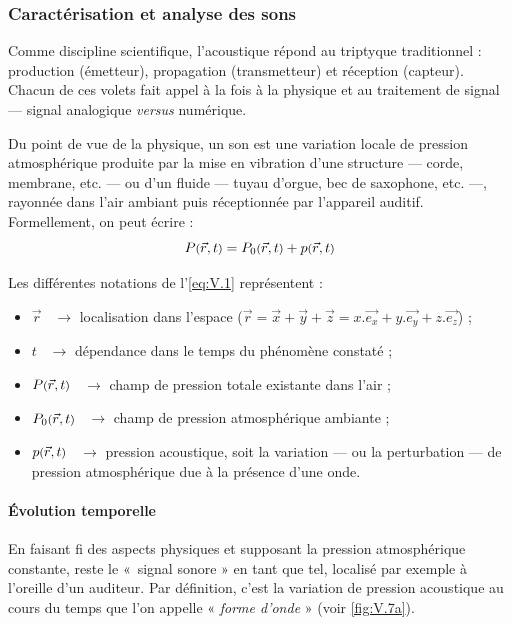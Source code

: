 \subsubsection[Caractérisation et analyse des sons]{Caractérisation et analyse des sons}
\label{subsub:V.2.2.1}

Comme discipline scientifique, l'acoustique répond au triptyque traditionnel : production (émetteur), propagation (transmetteur) et réception (capteur). Chacun de ces volets fait appel à la fois à la physique et au traitement de signal --- signal analogique \textit{versus} numérique. 


Du point de vue de la physique, un son est une variation locale de pression atmosphérique produite par la mise en vibration d'une structure --- corde, membrane, etc. --- ou d'un fluide --- tuyau d'orgue, bec de saxophone, etc. ---, rayonnée dans l'air ambiant puis réceptionnée par l'appareil auditif.
Formellement, on peut écrire :
\begin{equation}
P\mbox{\footnotesize (} \vec{r},t \mbox{\footnotesize )} = P_{0}\mbox{\footnotesize (} \vec{r},t \mbox{\footnotesize )} + p\mbox{\footnotesize (} \vec{r},t \mbox{\footnotesize )}
\label{eq:V.1}
\end{equation}

Les différentes notations de l'\cref{eq:V.1} représentent :
\begin{itemize}
	\item $\vec{r}$ ~$\rightarrow$ localisation dans l'espace 
($\vec{r} = \vec{x} + \vec{y} + \vec{z} = x.\vec{e_{x}} + y.\vec{e_{y}} + z.\vec{e_{z}}$) ;
	\item $t$ ~$\rightarrow$ dépendance dans le temps du phénomène constaté ;
	\item $P\mbox{\footnotesize (} \vec{r},t \mbox{\footnotesize )}$ ~$\rightarrow$ champ de pression totale existante dans l'air ;
	\item $P_{0}\mbox{\footnotesize (} \vec{r},t \mbox{\footnotesize )}$ ~$\rightarrow$ champ de pression atmosphérique ambiante ;
	\item $p\mbox{\footnotesize (} \vec{r},t \mbox{\footnotesize )}$ ~$\rightarrow$ pression acoustique, soit la variation --- ou la perturbation --- de pression atmosphérique due à la présence d'une onde.%
\end{itemize}

\paragraph*{Évolution temporelle} En faisant fi des aspects physiques et supposant la pression atmosphérique constante, reste le «~signal sonore » en tant que tel, localisé par exemple \nopagebreak à l'oreille d'un auditeur. Par définition, c'est la variation de pression acoustique au cours du temps que l'on appelle « \emph{forme d'onde} » (voir \cref{fig:V.7a}). 

